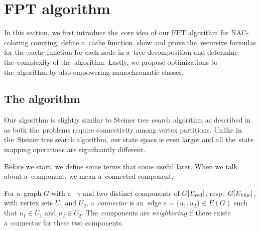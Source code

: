 \section{FPT algorithm}

In this section, we first introduce the~core idea of
our FPT algorithm for NAC-coloring counting,
define a~cache function,
show and prove the~recursive formulas for the~cache function for each node in a~tree decomposition
and determine the~complexity of the~algorithm.
Lastly, we propose optimizations to the~algorithm by also empowering monochromatic classes.


\subsection{The algorithm}

Our algorithm is slightly similar to Steiner tree search algorithm
as described in~\cite{book_parametrized_algorithms} as both the~problems require connectivity
among vertex partitions. Unlike in the~Steiner tree search algorithm,
our state space is even larger and all the~state mapping operations are significantly different.

Before we start, we define some terms that come useful later.
When we talk about a~component, we mean a~connected component.
%
\begin{definition}
	For a~graph \( G \) with a~\rbcol{} \( \gamma \)
	and two distinct components of \( G[E_\text{red}] \), resp.\ \( G[E_\text{blue}] \),
	with vertex sets \( U_1 \) and \( U_2 \),
	a~\emph{connector} is an~edge \( e = \{u_1, u_2\} \in E(G) \)
	such that \( u_1 \in U_1 \) and \( u_2 \in U_2 \).
	The~components are \emph{neighboring} if there exists
	a~connector for these two components.
\end{definition}
%

